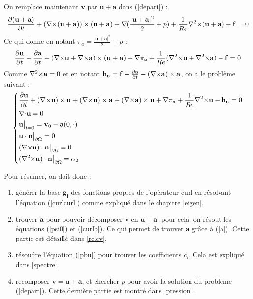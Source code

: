 On remplace maintenant $\mathbf{v}$ par $\mathbf{u}+\mathbf{a}$ dans (\ref{depart}) :
\[
\frac{\partial(\mathbf{u}+\mathbf{a})}{\partial t}+({\nabla\times}(\mathbf{u}+\mathbf{a}))\times(\mathbf{u}+\mathbf{a}) + {\nabla} (\frac{|\mathbf{u}+\mathbf{a}|^2}{2}+p) + \frac{1}{Re}{\nabla^2\times}(\mathbf{u}+\mathbf{a}) - \mathbf{f} = 0
\]
Ce qui donne en notant $\pi_a=\frac{|\mathbf{u}+\mathbf{a}|^2}{2}+p$ :
\[
\frac{\partial \mathbf{u}}{\partial t}+\frac{\partial \mathbf{a}}{\partial t} + ({\nabla\times} \mathbf{u}+{\nabla\times} \mathbf{a})\times(\mathbf{u}+\mathbf{a}) + {\nabla}\pi_{\mathbf{a}} + \frac{1}{Re}({\nabla^2\times} \mathbf{u}+{\nabla^2\times} \mathbf{a}) - \mathbf{f} = 0
\]
Comme ${\nabla^2\times} \mathbf{a} = 0$ et en notant $\mathbf{h_a}=\mathbf{f}-\frac{\partial \mathbf{a}}{\partial t} - ({\nabla\times} \mathbf{a})\times \mathbf{a}$, on a le problème suivant :
\begin{equation}
\label{pbu}
\left\{
\begin{aligned}
&\frac{\partial \mathbf{u}}{\partial t} + ({\nabla\times} \mathbf{u})\times \mathbf{u} + ({\nabla\times} \mathbf{u})\times \mathbf{a} +({\nabla\times} \mathbf{a})\times \mathbf{u} + {\nabla} \pi_{\mathbf{a}} +\frac{1}{Re}{\nabla^2\times}  \mathbf{u} - \mathbf{h_a} = 0\\
&{\nabla\cdot} \mathbf{u} = 0\\
&\mathbf{u}\big\rvert_{t=0} = \mathbf{v}_0 - \mathbf{a}(0,\cdot)\\
&\mathbf{u}\cdot \mathbf{n}{\big\rvert_{\partial\Omega}} = 0\\
&({\nabla\times} \mathbf{u})\cdot \mathbf{n}{\big\rvert_{\partial\Omega}} = 0\\
&({\nabla^2\times}  \mathbf{u})\cdot \mathbf{n}{\big\rvert_{\partial\Omega}} = \alpha_2
\end{aligned}
\right.
\end{equation}

Pour résumer, on doit donc :
\begin{enumerate}
\item générer la base $\mathbf{g_i}$ des fonctions propres de l'opérateur curl en résolvant l'équation (\ref{curlcurl}) comme expliqué dans le chapitre \ref{eigen}.
\item trouver $\mathbf{a}$ pour pouvoir décomposer $\mathbf{v}$ en $\mathbf{u}+\mathbf{a}$, pour cela, on résout les équations (\ref{psi0}) et (\ref{curlb}). Ce qui permet de trouver $\mathbf{a}$ grâce à (\ref{a}). Cette partie est détaillé dans \ref{relev}.
\item résoudre l'équation (\ref{pbu}) pour trouver les coefficients $c_i$. Cela est expliqué dans \ref{spectre}.
\item recomposer $\mathbf{v}=\mathbf{u}+\mathbf{a}$, et chercher $p$ pour avoir la solution du problème (\ref{depart}). Cette dernière partie est montré dans \ref{pression}.
\end{enumerate}


